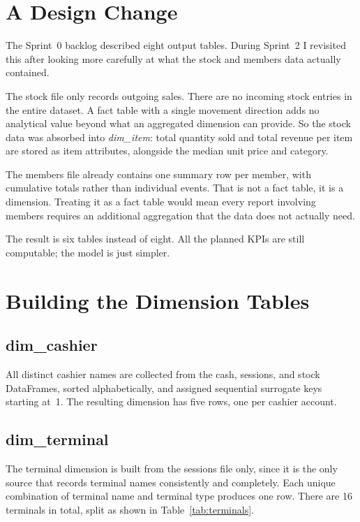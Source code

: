 \documentclass[12pt, a4paper]{report}
\begin{document}
\section{A Design Change}

The Sprint~0 backlog described eight output tables. During Sprint~2 I revisited this
after looking more carefully at what the stock and members data actually contained.

The stock file only records outgoing sales. There are no incoming stock entries in
the entire dataset. A fact table with a single movement direction adds no analytical
value beyond what an aggregated dimension can provide. So the stock data was absorbed
into \textit{dim\_item}: total quantity sold and total revenue per item are stored
as item attributes, alongside the median unit price and category.

The members file already contains one summary row per member, with cumulative totals
rather than individual events. That is not a fact table, it is a dimension. Treating
it as a fact table would mean every report involving members requires an additional
aggregation that the data does not actually need.

The result is six tables instead of eight. All the planned KPIs are still computable;
the model is just simpler.

\section{Building the Dimension Tables}

\subsection{dim\_cashier}

All distinct cashier names are collected from the cash, sessions, and stock
DataFrames, sorted alphabetically, and assigned sequential surrogate keys starting
at~1. The resulting dimension has five rows, one per cashier account.

\subsection{dim\_terminal}

The terminal dimension is built from the sessions file only, since it is the only
source that records terminal names consistently and completely. Each unique
combination of terminal name and terminal type produces one row. There are 16
terminals in total, split as shown in Table~\ref{tab:terminals}.
\end{document}
